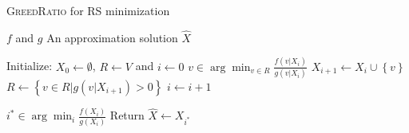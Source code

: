 \begin{algorithm}
	\caption{\textsc{GreedRatio} for RS minimization }
	\label{alg:greed-ratio}
	\begin{algorithmic}[1]
		\renewcommand{\algorithmicrequire}{\textbf{Input:}}
		\renewcommand{\algorithmicensure}{\textbf{Output:}}
		\Require $ f $ and $ g $
		\Ensure An approximation solution $ \hat{X} $
		
		\State Initialize: $ X_0 \leftarrow \emptyset $, $ R \leftarrow V $ and $ i \leftarrow 0 $
		\State $ v \in \arg \min_{v \in R} \frac{f(v|X_i)}{g(v|X_i)} $
		\State $ X_{i+1} \leftarrow X_i \cup \left\{ v \right\} $
		\State $ R \leftarrow \left\{ v \in R | g(v|X_{i+1}) > 0 \right\} $
		\State $ i \leftarrow i + 1 $
		\EndWhile
		
		\State $ i^* \in \arg \min_i \frac{f(X_i)}{g(X_i)} $
		\State Return $ \hat{X} \leftarrow X_{i^*} $
	\end{algorithmic}
\end{algorithm}